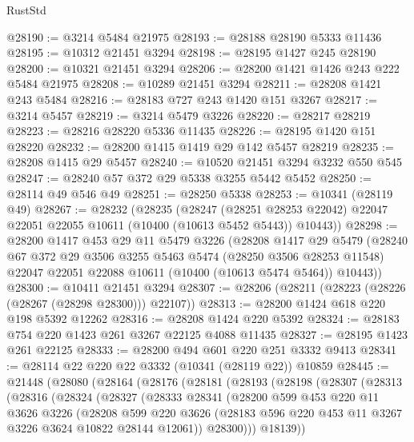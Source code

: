\begin{lexlean}{RustStd}
\begin{coremodule}
{\begin{coremodule}
{{{{{{{{{{{{{{{{{{{{{{{{{@28190 := @3214 @5484 @21975
@28193 := @28188 @28190 @5333 @11436
@28195 := @10312 @21451 @3294
@28198 := @28195 @1427 @245 @28190
@28200 := @10321 @21451 @3294
@28206 := @28200 @1421 @1426 @243 @222 @5484 @21975
@28208 := @10289 @21451 @3294
@28211 := @28208 @1421 @243 @5484
@28216 := @28183 @727 @243 @1420 @151 @3267
@28217 := @3214 @5457
@28219 := @3214 @5479 @3226
@28220 := @28217 @28219
@28223 := @28216 @28220 @5336 @11435
@28226 := @28195 @1420 @151 @28220
@28232 := @28200 @1415 @1419 @29 @142 @5457 @28219
@28235 := @28208 @1415 @29 @5457
@28240 := @10520 @21451 @3294 @3232 @550 @545
@28247 := @28240 @57 @372 @29 @5338 @3255 @5442 @5452
@28250 := @28114 @49 @546 @49
@28251 := @28250 @5338
@28253 := @10341 (@28119 @49)
@28267 := @28232
    (@28235
      (@28247
        (@28251 @28253 @22042)
        @22047
        @22051
        @22055
        @10611
        (@10400 (@10613 @5452 @5443))
        @10443))
@28298 := @28200
    @1417
    @453
    @29
    @11
    @5479
    @3226
    (@28208
      @1417
      @29
      @5479
      (@28240
        @67
        @372
        @29
        @3506
        @3255
        @5463
        @5474
        (@28250 @3506 @28253 @11548)
        @22047
        @22051
        @22088
        @10611
        (@10400 (@10613 @5474 @5464))
        @10443))
@28300 := @10411 @21451 @3294
@28307 := @28206 (@28211 (@28223 (@28226 (@28267 (@28298 @28300))) @22107))
@28313 := @28200 @1424 @618 @220 @198 @5392 @12262
@28316 := @28208 @1424 @220 @5392
@28324 := @28183 @754 @220 @1423 @261 @3267 @22125 @4088 @11435
@28327 := @28195 @1423 @261 @22125
@28333 := @28200 @494 @601 @220 @251 @3332 @9413
@28341 := @28114 @22 @220 @22 @3332 (@10341 (@28119 @22)) @10859
@28445 := @21448
    (@28080
      (@28164
        (@28176
          (@28181
            (@28193
              (@28198
                (@28307
                  (@28313
                    (@28316
                      (@28324
                        (@28327
                          (@28333
                            @28341
                            (@28200
                              @599
                              @453
                              @220
                              @11
                              @3626
                              @3226
                              (@28208
                                @599
                                @220
                                @3626
                                (@28183 @596 @220 @453 @11 @3267 @3226 @3624 @10822 @28144 @12061))
                              @28300)))
                        @18139))
}}}}}}}}}}}}}}}}}}}}}}}}}
\end{coremodule}}
\end{coremodule}
\end{lexlean}
